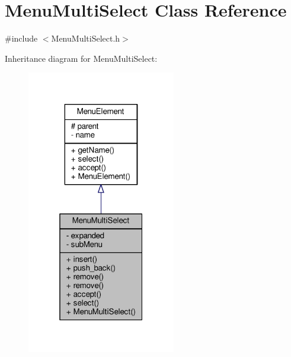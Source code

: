 \hypertarget{classMenuMultiSelect}{}\section{Menu\+Multi\+Select Class Reference}
\label{classMenuMultiSelect}


{\ttfamily \#include $<$Menu\+Multi\+Select.\+h$>$}



Inheritance diagram for Menu\+Multi\+Select\+:
\nopagebreak
\begin{figure}[H]
\begin{center}
\leavevmode
\includegraphics[width=184pt]{classMenuMultiSelect__inherit__graph}
\end{center}
\end{figure}


